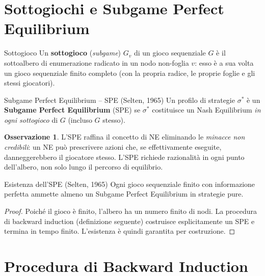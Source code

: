 \documentclass[12pt,a4paper,twoside]{book}
\theoremstyle{plain}
\theoremstyle{definition}
\newtheorem{remark}[theorem]{Osservazione}
\begin{document}
\section{Sottogiochi e Subgame Perfect Equilibrium}

\begin{defbox}{Sottogioco}
Un \textbf{sottogioco} (\emph{subgame}) $G_v$ di un gioco sequenziale $G$ è il sottoalbero di enumerazione radicato in un nodo non-foglia $v$: esso è a sua volta un gioco sequenziale finito completo (con la propria radice, le proprie foglie e gli stessi giocatori).
\end{defbox}

\begin{defbox}{Subgame Perfect Equilibrium -- SPE (Selten, 1965)}
Un profilo di strategie $\sigma^*$ è un \textbf{Subgame Perfect Equilibrium} (SPE) se $\sigma^*$ costituisce un Nash Equilibrium \emph{in ogni sottogioco} di $G$ (incluso $G$ stesso).
\end{defbox}

\begin{remark}
L'SPE raffina il concetto di NE eliminando le \emph{minacce non credibili}: un NE può prescrivere azioni che, se effettivamente eseguite, danneggerebbero il giocatore stesso. L'SPE richiede razionalità in ogni punto dell'albero, non solo lungo il percorso di equilibrio.
\end{remark}

\begin{thmbox}{Esistenza dell'SPE (Selten, 1965)}
\label{thm:spe-existence}
Ogni gioco sequenziale finito con informazione perfetta ammette almeno un Subgame Perfect Equilibrium in strategie pure.
\end{thmbox}

\begin{proof}
Poiché il gioco è finito, l'albero ha un numero finito di nodi. La procedura di backward induction (definizione seguente) costruisce esplicitamente un SPE e termina in tempo finito. L'esistenza è quindi garantita per costruzione.
\end{proof}

\section{Procedura di Backward Induction}
\end{document}
